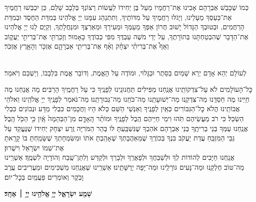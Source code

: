\documentclass[twoside, openany, parskip=half, 11pt]{book}
\begin{document}
כְּמוֹ שֶׁכָּבַשׁ אַבְרָהָם אָבִינוּ אֶת־רַחֲמָיו מֵעַל בֶּן יְחִידוֹ לַעֲשׂוֹת רְצוֹנְךָ בְּלֵבָב שָׁלֵם, כֵּן יִכְבְּשׁוּ רַחֲמֶיךָ אֶת־כַּעַסְךָ מֵעָלֵינוּ, וְיָגֹלּוּ רַחֲמֶיךָ עַל מִדּוֹתֶיךָ, וְתִתְנַהֵג עִמָּנוּ יְיָ אֱלֹהֵינוּ בְּמִדַּת הַחֶסֶד וּבְמִדַּת הָרַחֲמִים, וּבְטוּבְךָ הַגָּדוֹל יָשׁוּב חֲרוֹן אַפְּךָ מֵעַמְּךָ וּמֵעִירְךָ וּמֵאַרְצְךָ וּמִנַּחֲלָתֶךָ, וְקַיֶּם לָנוּ יְיָ אֱלֹהֵינוּ אֶת־הַדָּבָר שֶׁהִבְטַחְתָּנוּ בְּתוֹרָתֶךָ, עַל יְדֵי משֶׁה עַבְדֶּךָ מִפִּי כְבוֹדֶךָ כָּאָמוּר׃
וְזָכַרְתִּ֖י אֶת־בְּרִיתִ֣י יַעֲק֑וֹב וְאַף֩ אֶת־בְּרִיתִ֨י יִצְחָ֜ק וְאַ֨ף אֶת־בְּרִיתִ֧י אַבְרָהָ֛ם אֶזְכֹּ֖ר וְהָאָ֥רֶץ אֶזְכֹּֽר׃\\

\\
\begin{footnotesize}לְעוֹלָם יְהֵא אָדָם יְרֵא שָׁמַיִם בַּסֵּתֶר וּבַגָּלוּי, וּמוֹדֶה עַל הָאֱמֶת, וְדוֹבֵר אֱמֶת בִּלְבָבוֹ, וְיַשְׁכֵּם וְיֹאמַר׃\end{footnotesize}

כׇּל־הָעוֹלָמִים לֹא עַל־צִדְקוֹתֵֽינוּ אֲנַֽחְנוּ מַפִּילִים תַּחֲנוּנֵֽינוּ לְפָנֶֽיךָ כִּי עַל רַחֲמֶֽיךָ הָרַבִּים׃ מָה אֲנַחְנוּ מֶה חַיֵּֽינוּ מֶה חַסְדֵּֽנוּ מַה־צִּדְקֵֽנוּ מַה־יְּשׁוּעָתֵֽנוּ מַה־כֹּחֵֽנוּ מַה־גְּבוּרָתֵֽנוּ׃ מַה־נֹּאמַר לְפָנֶֽיךָ יְיָ אֱלֹהֵֽינוּ וֵאלֹהֵי אֲבוֹתֵֽינוּ הֲלֹא כׇל־הַגִּבּוֹרִים כְּאַֽיִן לְפָנֶֽיךָ וְאַנְשֵׁי הַשֵּׁם כְּלֹא הָיוּ וַחֲכָמִים כִּבְלִי מַדָּע וּנְבוֹנִים כִּבְלִי הַשְׂכֵּל׃ כִּי רֹב מַעֲשֵׂיהֶם תֹּֽהוּ וִימֵי חַיֵּיהֶם הֶֽבֶל לְפָנֶֽיךָ
וּמוֹתַ֨ר הָֽאָדָ֤ם מִן־הַבְּהֵמָה֙ אָֽ֔יִן כִּ֥י הַכֹּ֖ל הָֽבֶל׃ \\
אֲנַֽחְנוּ עַמְּךָ בְּנֵי בְרִיתֶֽךָ בְּנֵי אַבְרָהָם אֹהַבְךָ שֶׁנִּשְׁבַּֽעְתָּ לּוֹ בְּהַר הַמֹּרִיָּה זֶֽרַע יִצְחָק יְחִידוֹ שֶׁנֶּעֱקַד עַל גַּבֵּי הַמִּזְבֵּֽחַ עֲדַת יַעֲקֹב בִּנְךָ בְּכוֹרֶֽךָ שֶׁמֵּאַהֲבָתְךָ שֶׁאָהַֽבְתָּ אֹתוֹ וּמִשִּׂמְחָתְךָ שֶׁשָּׂמַֽחְתָּ בּוֹ קָרָֽאתָ אֶת־שְׁמוֹ יִשְׂרָאֵל וִישֻׁרוּן׃ \\
אֲנַֽחְנוּ חַיָּבִים לְהוֹדוֹת לְךָ וּלְשַׁבֵּחֲךָ וּלְפָאֶרְֽךָ וּלְבָרֵךְ וּלְקַדֵּשׁ וְלִתֵּן־שֶֽׁבַח וְהוֹדָיָה לִשְׁמֶֽךָ׃ אַשְׁרֵֽינוּ מַה־טּוֹב חֶלְקֵֽנוּ וּמַה־נָּעִים גּוֹרָלֵֽינוּ וּמַה־יָּפָה יְרֻשָּׁתֵֽינוּ׃ אַשְׁרֵֽינוּ שֶׁאֲנַֽחְנוּ מַשְׁכִּימִים וּמַעֲרִיבִים עֶֽרֶב וָבֹֽקֶר וְאוֹמְרִים פַּעֲמַֽיִם בְּכׇל־יוֹם׃


\begin{Large}
\textbf{שְׁמַ֖ע יִשְׂרָאֵ֑ל יְיָ֥ אֱלֹהֵ֖ינוּ יְיָ֥ ׀ אֶחָֽד׃}
\end{Large}
\end{document}
